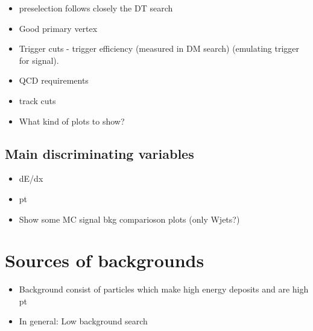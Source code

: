 \begin{itemize}
\item preselection follows closely the DT search
\item Good primary vertex

\item Trigger cuts - trigger efficiency (measured in DM search) (emulating trigger for signal).
\item QCD requirements
\item track cuts
\item What kind of plots to show? 
\end{itemize}




























\subsection{Main discriminating variables}
\begin{itemize}
\item dE/dx
\item pt
\item Show some MC signal bkg comparioson plots (only Wjets?)
\end{itemize}
\section{Sources of backgrounds}
\label{sec:SourcesOfBackgrounds}
\begin{itemize}
\item Background consist of particles which make high energy deposits and are high pt
\item In general: Low background search
\end{itemize}
